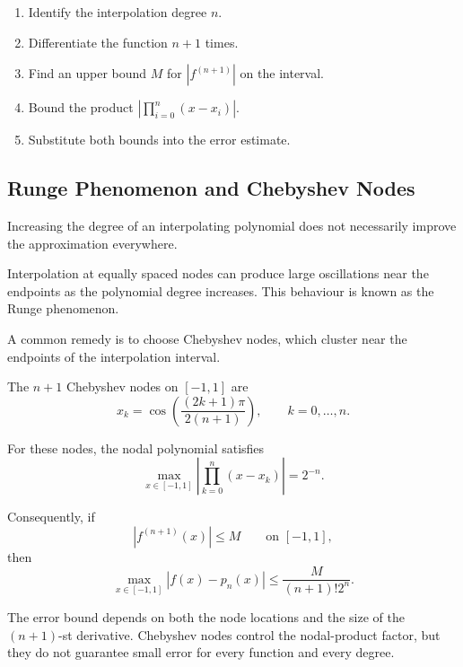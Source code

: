 \begin{remark}
  \begin{enumerate} \emph{}
    \item Identify the interpolation degree \(n\).
    \item Differentiate the function \(n+1\) times.
    \item Find an upper bound \(M\) for \(|f^{(n+1)}|\) on the interval.
    \item Bound the product \(\left|\prod_{i=0}^n(x-x_i)\right|\).
    \item Substitute both bounds into the error estimate.
  \end{enumerate}
\end{remark}

\subsection{Runge Phenomenon and Chebyshev Nodes}

Increasing the degree of an interpolating polynomial does not necessarily improve the approximation everywhere.

\begin{remark}
  Interpolation at equally spaced nodes can produce large oscillations near the endpoints as the polynomial degree increases. This behaviour is known as the Runge phenomenon.
\end{remark}

A common remedy is to choose Chebyshev nodes, which cluster near the endpoints of the interpolation interval.

\begin{definition}
  The \(n+1\) Chebyshev nodes on \([-1,1]\) are
  \[
    \boxed{
      x_k=\cos\left(\frac{(2k+1)\pi}{2(n+1)}\right),
      \qquad k=0,\ldots,n.
    }
  \]
\end{definition}

For these nodes, the nodal polynomial satisfies
\[
  \boxed{
    \max_{x\in[-1,1]}
    \left|\prod_{k=0}^n(x-x_k)\right|
    =2^{-n}.
  }
\]

Consequently, if
\[
  |f^{(n+1)}(x)|\leq M
  \qquad \text{on }[-1,1],
\]
then
\[
  \boxed{
    \max_{x\in[-1,1]}|f(x)-p_n(x)|
    \leq \frac{M}{(n+1)!2^n}.
  }
\]

\begin{remark}
  The error bound depends on both the node locations and the size of the \((n+1)\)-st derivative. Chebyshev nodes control the nodal-product factor, but they do not guarantee small error for every function and every degree.
\end{remark}

